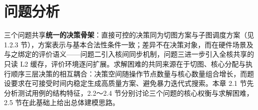 \section{问题分析}\label{sec:analysis}

三个问题共享\textbf{统一的决策骨架}：直接可控的决策同为切图方案与子图调度方案（见 1.2.3 节），方案表示与基本合法性条件一致；差异不在决策对象，而在硬件场景及与之绑定的评价语义——问题二引入核间同步机制，问题三进一步引入全核共享的只读 L2 缓存，评价环境逐问扩展。求解困难的共同来源在于切图、核心分配与执行顺序三层决策的相互耦合：决策空间随操作节点数量与核心数量组合增长，而题设要求在可接受时间内稳定生成高质量方案、避免暴力迭代式搜索。本章 2.1 节先分析测试用例的结构特征，2.2～2.4 节分别讨论三个问题的核心权衡与求解困难，2.5 节在此基础上给出总体建模思路。


